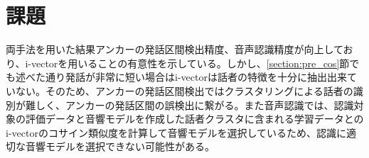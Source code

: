 \section{課題}
両手法を用いた結果アンカーの発話区間検出精度、音声認識精度が向上しており、i-vectorを用いることの有意性を示している。しかし、\ref{section:pre_cos}節でも述べた通り発話が非常に短い場合はi-vectorは話者の特徴を十分に抽出出来ていない。そのため、アンカーの発話区間検出ではクラスタリングによる話者の識別が難しく、アンカーの発話区間の誤検出に繋がる。また音声認識では、認識対象の評価データと音響モデルを作成した話者クラスタに含まれる学習データとのi-vectorのコサイン類似度を計算して音響モデルを選択しているため、認識に適切な音響モデルを選択できない可能性がある。
